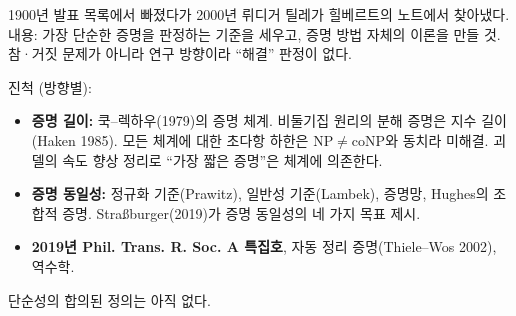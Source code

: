 1900년 발표 목록에서 빠졌다가 2000년 뤼디거 틸레가 힐베르트의 노트에서
찾아냈다. 내용: 가장 단순한 증명을 판정하는 기준을 세우고, 증명 방법
자체의 이론을 만들 것. 참·거짓 문제가 아니라 연구 방향이라 ``해결''
판정이 없다.

진척 (방향별):

\begin{itemize}
\tightlist
\item
  \textbf{증명 길이:} 쿡--렉하우(1979)의 증명 체계. 비둘기집 원리의 분해
  증명은 지수 길이(Haken 1985). 모든 체계에 대한 초다항 하한은
  \(\mathrm{NP}\ne\mathrm{coNP}\)와 동치라 미해결. 괴델의 속도 향상
  정리로 ``가장 짧은 증명''은 체계에 의존한다.
\item
  \textbf{증명 동일성:} 정규화 기준(Prawitz), 일반성 기준(Lambek),
  증명망, Hughes의 조합적 증명. Straßburger(2019)가 증명 동일성의 네
  가지 목표 제시.
\item
  \textbf{2019년 Phil. Trans. R. Soc. A 특집호}, 자동 정리
  증명(Thiele--Wos 2002), 역수학.
\end{itemize}

단순성의 합의된 정의는 아직 없다.
